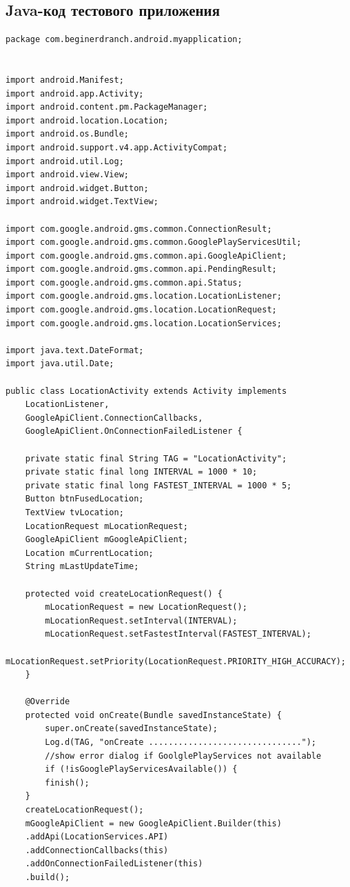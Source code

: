 \documentclass[a4paper,12pt]{article}
\begin{document}
\subsection{Java-код тестового приложения}
\begin{lstlisting}
package com.beginerdranch.android.myapplication;


import android.Manifest;
import android.app.Activity;
import android.content.pm.PackageManager;
import android.location.Location;
import android.os.Bundle;
import android.support.v4.app.ActivityCompat;
import android.util.Log;
import android.view.View;
import android.widget.Button;
import android.widget.TextView;

import com.google.android.gms.common.ConnectionResult;
import com.google.android.gms.common.GooglePlayServicesUtil;
import com.google.android.gms.common.api.GoogleApiClient;
import com.google.android.gms.common.api.PendingResult;
import com.google.android.gms.common.api.Status;
import com.google.android.gms.location.LocationListener;
import com.google.android.gms.location.LocationRequest;
import com.google.android.gms.location.LocationServices;

import java.text.DateFormat;
import java.util.Date;

public class LocationActivity extends Activity implements
	LocationListener,
	GoogleApiClient.ConnectionCallbacks,
	GoogleApiClient.OnConnectionFailedListener {
	
	private static final String TAG = "LocationActivity";
	private static final long INTERVAL = 1000 * 10;
	private static final long FASTEST_INTERVAL = 1000 * 5;
	Button btnFusedLocation;
	TextView tvLocation;
	LocationRequest mLocationRequest;
	GoogleApiClient mGoogleApiClient;
	Location mCurrentLocation;
	String mLastUpdateTime;
	
	protected void createLocationRequest() {
		mLocationRequest = new LocationRequest();
		mLocationRequest.setInterval(INTERVAL);
		mLocationRequest.setFastestInterval(FASTEST_INTERVAL);
		mLocationRequest.setPriority(LocationRequest.PRIORITY_HIGH_ACCURACY);
	}
	
	@Override
	protected void onCreate(Bundle savedInstanceState) {
		super.onCreate(savedInstanceState);
		Log.d(TAG, "onCreate ...............................");
		//show error dialog if GoolglePlayServices not available
		if (!isGooglePlayServicesAvailable()) {
		finish();
	}
	createLocationRequest();
	mGoogleApiClient = new GoogleApiClient.Builder(this)
	.addApi(LocationServices.API)
	.addConnectionCallbacks(this)
	.addOnConnectionFailedListener(this)
	.build();
	

\end{lstlisting}
\end{document}
